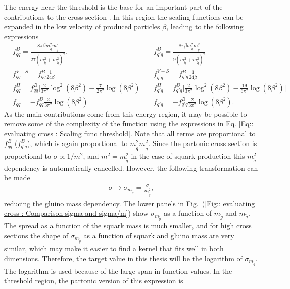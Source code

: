\documentclass[twoside,english]{uiofysmaster}
\begin{document}
The energy near the threshold is the base for an important part of the contributions to the cross section \cite{beenakker1997squark}. In this region the scaling functions can be expanded in the low velocity of produced particles $\beta$, leading to the following expressions \cite{beenakker1997squark}
\begin{align}
&f_{qq}^B = \frac{8 \pi \beta m_{\tilde{q}}^2 m_{\tilde{g}}^2}{27(m_{\tilde{q}}^2 + m_{\tilde{g}}^2)^2}, &&f_{q'q}^B = \frac{8 \pi \beta m_{\tilde{q}}^2 m_{\tilde{g}}^2}{9(m_{\tilde{q}}^2 + m_{\tilde{g}}^2)^2} \nonumber \\
& f_{qq}^{V+S} = f_{qq}^B \frac{1}{24 \beta} && f_{q'q}^{V+S} = f_{q'q}^B \frac{1}{24 \beta} \nonumber \\
&f_{qq}^H = f_{qq}^B \Big[\frac{2}{3 \pi^2} \log^2(8 \beta^2) - \frac{7}{2 \pi^2} \log (8 \beta^2) \Big] &&f_{q'q}^H = f_{q'q}^B \Big[\frac{2}{3 \pi^2} \log^2(8 \beta^2) - \frac{19}{6 \pi^2} \log (8 \beta^2) \Big] \nonumber \\
& \bar{f}_{qq} = - f_{qq}^B \frac{2}{3 \pi^2} \log (8 \beta^2) &&\bar{f}_{q'q} = - f_{q'q}^B \frac{2}{3 \pi^2} \log (8 \beta^2).\label{Eq:: evaluating cross : Scaling func threshold}
\end{align}
As the main contributions come from this energy region, it may be possible to remove some of the complexity of the function using the expressions in Eq. \ref{Eq:: evaluating cross : Scaling func threshold}. Note that all terms are proportional to $f_{qq}^B$ ($f_{q'q}^B$), which is again proportional to $m_{\tilde{q}}^2 m_{\tilde{g}}^2$. Since the partonic cross section is proportional to $\sigma \propto 1/m^2$, and $m^2 = m_{\tilde{q}}^2$ in the case of squark production this $m_{\tilde{q}}^2$-dependency is automatically cancelled. However, the following transformation can be made
\begin{align}
\sigma \rightarrow \sigma_{m_{\tilde{g}}} = \frac{\sigma}{m_{\tilde{g}}^2},
\end{align}
reducing the gluino mass dependency. The lower panels in Fig.\ (\ref{Fig:: evaluating cross : Comparison sigma and sigma/m}) show $\sigma_{m_{\tilde{g}}}$ as a function of $m_{\tilde{g}}$ and $m_{\tilde{q}}$. The spread as a function of the squark mass is much smaller, and for high cross sections the shape of $\sigma_{m_{\tilde{g}}}$ as a function of squark and gluino mass are very similar, which may make it easier to find a kernel that fits well in both dimensions. Therefore, the target value in this thesis will be the logarithm of $\sigma_{m_{\tilde{g}}}$. The logarithm is used because of the large span in function values. In the threshold region, the partonic version of this expression is
\end{document}
